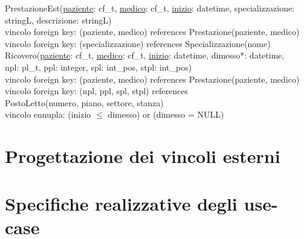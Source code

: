 \documentclass[a4paper,12pt]{report}
\begin{document}
      \hspace*{-0.75cm}
      PrestazioneEst(\underline{paziente}: cf\_t, \underline{medico}: cf\_t, \underline{inizio}: datetime, specializzazione: stringL, descrizione: stringL) \\
      \hspace*{1cm}vincolo foreign key: (paziente, medico) references Prestazione(paziente, medico) \\
      \hspace*{1cm}vincolo foreign key: (specializzazione) references Specializzazione(nome) \\

      \hspace*{-0.75cm}
      Ricovero(\underline{paziente}: cf\_t, \underline{medico}: cf\_t, \underline{inizio}: datetime, dimesso*: datetime, \\
      \hspace*{2cm}npl: pl\_t, ppl: integer, spl: int\_pos, stpl: int\_pos) \\
      \hspace*{1cm}vincolo foreign key: (paziente, medico) references Prestazione(paziente, medico) \\
      \hspace*{1cm}vincolo foreign key: (npl, ppl, spl, stpl) references \\
      \hspace*{2cm}PostoLetto(numero, piano, settore, stanza) \\
      \hspace*{1cm}vincolo ennupla: (inizio $\leq$ dimesso) or (dimesso = NULL) \\

    \chapter{Progettazione dei vincoli esterni}
      \begin{tiny}
        
      \end{tiny}

    \chapter{Specifiche realizzative degli use-case}
      \begin{tiny}
        
      \end{tiny}
    
\end{document}
